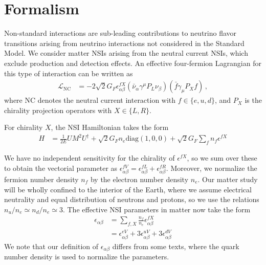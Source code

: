 \documentclass[draft=True]{revtex4-2}
\begin{document}
\section{Formalism}
Non-standard interactions are sub-leading contributions to neutrino flavor transitions arising from neutrino interactions not considered in the Standard Model.
We consider matter NSIs arising from the neutral current NSIs, which exclude production 
and detection effects. An effective four-fermion Lagrangian for this type of interaction can be written as
\begin{align}
   \mathcal{L}_{\mathrm{NC}} &= -2 \sqrt{2} G_{F} \epsilon_{\alpha \beta}^{f X}\left(\bar{\nu}_{\alpha} \gamma^{\mu} P_{L} \nu_{\beta}\right)\left(\bar{f} \gamma_{\mu} P_{X} f\right)\,,
\end{align}
where NC denotes the neutral current interaction with 
$f \in \{e,u,d\}$, and $P_X$ is the chirality projection operators with $X \in \{L,R\}$.  

For chirality $X$, the NSI Hamiltonian takes the form 
\begin{align}
   H &= \frac{1}{2E} UM^2U^\dagger + \sqrt{2}G_F n_e \text{diag}(1,0,0) + \sqrt{2}G_F \sum_f n_f \epsilon^{fX}
\end{align}

We have no independent sensitivity for the chirality of $\epsilon^{fX}$, so we sum over these to obtain the vectorial parameter as $\epsilon^{fV}_{\alpha\beta} = \epsilon^{fL}_{\alpha\beta}+ \epsilon^{fR}_{\alpha\beta}$.
Moreover, we normalize the fermion number density $n_f$ by
the electron number density $n_e$. Our matter study will be wholly confined to the interior of the Earth, where we assume electrical neutrality and equal distribution of neutrons and protons, 
so we use the relations $n_u/n_e \simeq n_d/n_e \simeq 3$.
The effective NSI parameters in matter now take the form
\begin{align} \label{eq:epsilon}
    \epsilon_{\alpha\beta} &= \sum_{f,X} \frac{n_f}{n_e} \epsilon^{fX}_{\alpha\beta} \nonumber \\
                           &= \epsilon_{\alpha\beta}^{eV} + 3\epsilon_{\alpha\beta}^{uV} + 3\epsilon_{\alpha\beta}^{dV}
\end{align}
We note that our definition of $\epsilon_{\alpha\beta}$ differs from some texts, where the quark number density is used to normalize
the parameters\cite{deepcoreNSI}.
\end{document}
